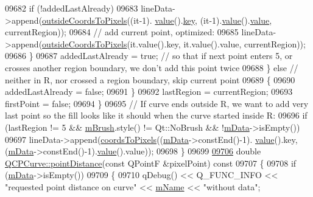 \begin{DoxyCode}
09682         \textcolor{keywordflow}{if} (!addedLastAlready)
09683           lineData->append(\hyperlink{a00028_aec2099a1569775209f73bbb0d3da7c16}{outsideCoordsToPixels}((it-1).
      \hyperlink{a00116_aee90379adb0307effb138f4871edbc5c}{value}().\hyperlink{a00116_a94bb892c30911cd62cba0707a5395be4}{key}, (it-1).\hyperlink{a00116_aee90379adb0307effb138f4871edbc5c}{value}().\hyperlink{a00116_aee90379adb0307effb138f4871edbc5c}{value}, currentRegion));
09684         \textcolor{comment}{// add current point, optimized:}
09685         lineData->append(\hyperlink{a00028_aec2099a1569775209f73bbb0d3da7c16}{outsideCoordsToPixels}(it.value().key, it.value().value, 
      currentRegion));
09686       \}
09687       addedLastAlready = \textcolor{keyword}{true}; \textcolor{comment}{// so that if next point enters 5, or crosses another region boundary, we
       don't add this point twice}
09688     \} \textcolor{keywordflow}{else} \textcolor{comment}{// neither in R, nor crossed a region boundary, skip current point}
09689     \{
09690       addedLastAlready = \textcolor{keyword}{false};
09691     \}
09692     lastRegion = currentRegion;
09693     firstPoint = \textcolor{keyword}{false};
09694   \}
09695   \textcolor{comment}{// If curve ends outside R, we want to add very last point so the fill looks like it should when the
       curve started inside R:}
09696   \textcolor{keywordflow}{if} (lastRegion != 5 && \hyperlink{a00024_a33f00674c0161c13315ab9da0895418e}{mBrush}.style() != Qt::NoBrush && !\hyperlink{a00028_a88d533e455bca96004b049e99168731b}{mData}->isEmpty())
09697     lineData->append(\hyperlink{a00024_ade710a776104b14c1c835168ce1bfc5c}{coordsToPixels}((\hyperlink{a00028_a88d533e455bca96004b049e99168731b}{mData}->constEnd()-1).
      \hyperlink{a00116_aee90379adb0307effb138f4871edbc5c}{value}().key, (\hyperlink{a00028_a88d533e455bca96004b049e99168731b}{mData}->constEnd()-1).\hyperlink{a00116_aee90379adb0307effb138f4871edbc5c}{value}().value));
09698 \}
09699 
\hypertarget{a00115_source_l09706}{}\hyperlink{a00028_acd7a68c6f268ce1ab845eaf69fc2c6a6}{09706} \textcolor{keywordtype}{double} \hyperlink{a00028_acd7a68c6f268ce1ab845eaf69fc2c6a6}{QCPCurve::pointDistance}(\textcolor{keyword}{const} QPointF &pixelPoint)\textcolor{keyword}{ const}
09707 \textcolor{keyword}{}\{
09708   \textcolor{keywordflow}{if} (\hyperlink{a00028_a88d533e455bca96004b049e99168731b}{mData}->isEmpty())
09709   \{
09710     qDebug() << Q\_FUNC\_INFO << \textcolor{stringliteral}{"requested point distance on curve"} << \hyperlink{a00024_ac29ffef424e2488675930de18cde612a}{mName} << \textcolor{stringliteral}{"without data"};

\end{DoxyCode}
